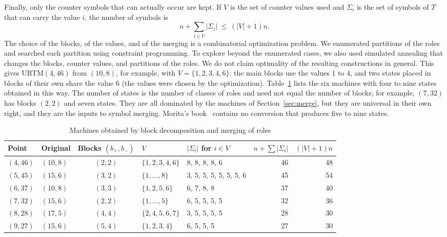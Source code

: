 \documentclass{article}
\theoremstyle{definition}
\theoremstyle{remark}
\begin{document}
Finally, only the counter symbols that can actually occur are kept.
If $V$ is the set of counter values used and $\Sigma_i$ is the set of symbols of $T$ that can carry the value $i$, the number of symbols is
\[
  n+\sum_{i\in V}|\Sigma_i|\ \le\ (|V|+1)n .
\]
The choice of the blocks, of the values, and of the merging is a combinatorial optimization problem.
We enumerated partitions of the roles and searched each partition using constraint programming. To explore beyond the enumerated cases, we also used simulated annealing that changes the blocks, counter values, and partitions of the roles. We do not claim optimality of the resulting constructions in general.
This gives URTM$(4,46)$ from $(10,8)$, for example, with $V=\{1,2,3,4,6\}$: the main blocks use the values 1 to 4, and two states placed in blocks of their own share the value 6 (the values were chosen by the optimization).
Table~\ref{tab:blocks} lists the six machines with four to nine states obtained in this way. The number of states is the number of classes of roles and need not equal the number of blocks; for example, $(7,32)$ has blocks $(2,2)$ and seven states.
They are all dominated by the machines of Section~\ref{sec:merge}, but they are universal in their own right, and they are the inputs to symbol merging.
Morita's book~\cite{Morita17} contains no conversion that produces five to nine states.

\begin{table}[tb]
\centering
\caption{Machines obtained by block decomposition and merging of roles}
\label{tab:blocks}
\small
\begin{tabular}{llcllrr}
\toprule
Point & Original & Blocks $(b_+,b_-)$ & $V$ & $|\Sigma_i|$ for $i\in V$ & $n+\sum|\Sigma_i|$ & $(|V|+1)n$ \\
\midrule
$(4,46)$ & $(10,8)$ & $(2,2)$ & $\{1,2,3,4,6\}$ & 8, 8, 8, 8, 6 & 46 & 48 \\
$(5,45)$ & $(15,6)$ & $(3,2)$ & $\{1,\dots,8\}$ & 3, 5, 5, 5, 5, 5, 5, 6 & 45 & 54 \\
$(6,37)$ & $(10,8)$ & $(3,3)$ & $\{1,2,5,6\}$ & 6, 7, 8, 8 & 37 & 40 \\
$(7,32)$ & $(15,6)$ & $(2,2)$ & $\{1,\dots,5\}$ & 6, 5, 5, 5, 5 & 32 & 36 \\
$(8,28)$ & $(17,5)$ & $(4,4)$ & $\{2,4,5,6,7\}$ & 3, 5, 5, 5, 5 & 28 & 30 \\
$(9,27)$ & $(15,6)$ & $(5,4)$ & $\{1,2,3,4\}$ & 6, 5, 5, 5 & 27 & 30 \\
\bottomrule
\end{tabular}
\end{table}
\end{document}
